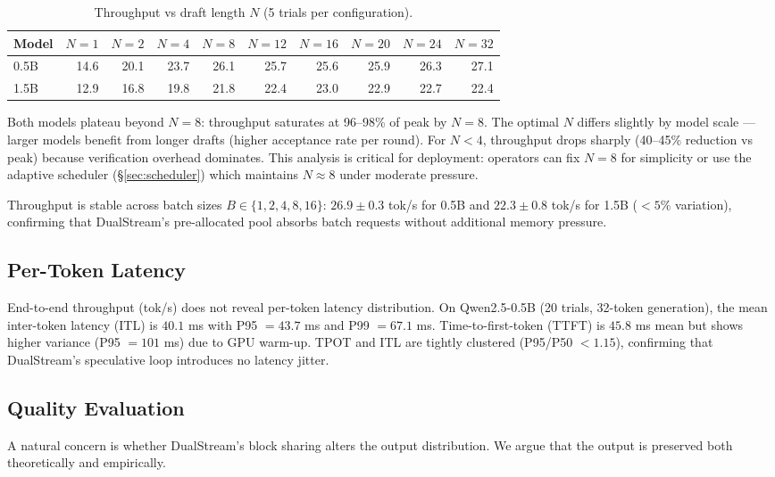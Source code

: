 \documentclass[review]{elsarticle}
\theoremstyle{definition}
\theoremstyle{remark}
\begin{document}
\begin{table}[t]
\centering
\caption{Throughput vs draft length $N$ (5 trials per configuration).}
\label{tab:draft_sweep}
\begin{tabular}{lrrrrrrrrr}
\toprule
Model & $N=1$ & $N=2$ & $N=4$ & $N=8$ & $N=12$ & $N=16$ & $N=20$ & $N=24$ & $N=32$ \\
\midrule
0.5B & 14.6 & 20.1 & 23.7 & 26.1 & 25.7 & 25.6 & 25.9 & 26.3 & 27.1 \\
1.5B & 12.9 & 16.8 & 19.8 & 21.8 & 22.4 & 23.0 & 22.9 & 22.7 & 22.4 \\
\bottomrule
\end{tabular}
\end{table}

Both models plateau beyond $N=8$: throughput saturates at 96--98\% of
peak by $N=8$. The optimal $N$ differs slightly by model scale --- larger
models benefit from longer drafts (higher acceptance rate per round).
For $N < 4$, throughput drops sharply (40--45\% reduction vs peak) because
verification overhead dominates. This analysis is critical for deployment:
operators can fix $N=8$ for simplicity or use the adaptive scheduler
(\S\ref{sec:scheduler}) which maintains $N \approx 8$ under moderate
pressure.

Throughput is stable across batch sizes $B \in \{1,2,4,8,16\}$:
$26.9 \pm 0.3$ tok/s for 0.5B and $22.3 \pm 0.8$ tok/s for 1.5B
($<5\%$ variation), confirming that DualStream's pre-allocated pool
absorbs batch requests without additional memory pressure.

\subsection{Per-Token Latency}

End-to-end throughput (tok/s) does not reveal per-token latency
distribution. On Qwen2.5-0.5B (20 trials, 32-token generation),
the mean inter-token latency (ITL) is $40.1$ ms with P95 $= 43.7$ ms
and P99 $= 67.1$ ms. Time-to-first-token (TTFT) is $45.8$ ms mean
but shows higher variance (P95 $= 101$ ms) due to GPU warm-up.
TPOT and ITL are tightly clustered (P95/P50 $< 1.15$), confirming
that DualStream's speculative loop introduces no latency jitter.

\subsection{Quality Evaluation}
\label{sec:quality}

A natural concern is whether DualStream's block sharing alters the output
distribution. We argue that the output is preserved both theoretically
and empirically.
\end{document}
